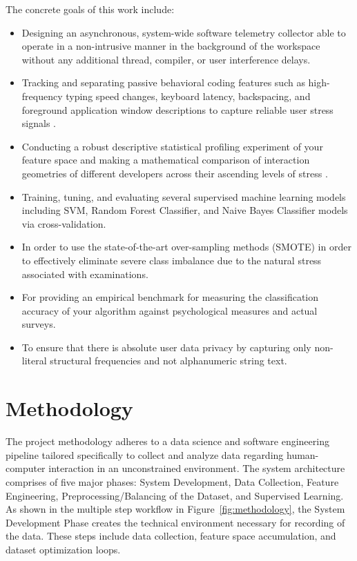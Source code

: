 \noindent The concrete goals of this work include:
\begin{itemize}
    \item Designing an asynchronous, system-wide software telemetry collector able to operate in a non-intrusive manner in the background of the workspace without any additional thread, compiler, or user interference delays.
    
    \item Tracking and separating passive behavioral coding features such as high-frequency typing speed changes, keyboard latency, backspacing, and foreground application window descriptions to capture reliable user stress signals \cite{bunia2024keystroke}.
    
    \item Conducting a robust descriptive statistical profiling experiment of your feature space and making a mathematical comparison of interaction geometries of different developers across their ascending levels of stress \cite{anxietyPrediction2023}.
    
    \item Training, tuning, and evaluating several supervised machine learning models including SVM, Random Forest Classifier, and Naive Bayes Classifier models via cross-validation.
    
   \item In order to use the state-of-the-art over-sampling methods (SMOTE) in order to effectively eliminate severe class imbalance due to the natural stress associated with examinations.
        
        \item For providing an empirical benchmark for measuring the classification accuracy of your algorithm against psychological measures and actual surveys.
        
        \item To ensure that there is absolute user data privacy by capturing only non-literal structural frequencies and not alphanumeric string text.
\end{itemize}

\section{Methodology}
The project methodology adheres to a data science and software engineering pipeline tailored specifically to collect and analyze data regarding human-computer interaction in an unconstrained environment. The system architecture comprises of five major phases: System Development, Data Collection, Feature Engineering, Preprocessing/Balancing of the Dataset, and Supervised Learning. As shown in the multiple step workflow in Figure~\ref{fig:methodology}, the System Development Phase creates the technical environment necessary for recording of the data. These steps include data collection, feature space accumulation, and dataset optimization loops.

